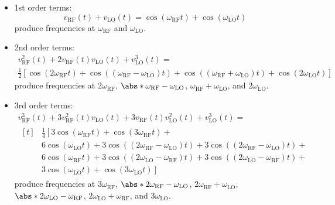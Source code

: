 \documentclass{article}
\begin{document}
\begin{itemize}
    \item 1st order terms:
          \begin{equation*}
              v_{\mathrm{RF}}\left( t \right) + v_{\mathrm{LO}}\left( t \right) = \cos{\left( \omega_{\mathrm{RF}} t \right)} + \cos{\left( \omega_{\mathrm{LO}} t \right)}
          \end{equation*}
          produce frequencies at \(\omega_{\mathrm{RF}}\) and \(\omega_{\mathrm{LO}}\).
    \item 2nd order terms:
          \begin{multline*}
              v_{\mathrm{RF}}^2\left( t \right) + 2 v_{\mathrm{RF}}\left( t \right) v_{\mathrm{LO}}\left( t \right) + v_{\mathrm{LO}}^3\left( t \right) = \\
              \frac{1}{2} \left[ \cos{\left( 2\omega_{\mathrm{RF}} t \right)} + \cos{\left( \left( \omega_{\mathrm{RF}} - \omega_{\mathrm{LO}} \right) t \right)} + \cos{\left( \left( \omega_{\mathrm{RF}} + \omega_{\mathrm{LO}} \right) t \right)} + \cos{\left( 2\omega_{\mathrm{LO}} t \right)} \right]
          \end{multline*}
          produce frequencies at \(2\omega_{\mathrm{RF}}\), \(\abs*{\omega_{\mathrm{RF}} - \omega_{\mathrm{LO}}}\), \(\omega_{\mathrm{RF}} + \omega_{\mathrm{LO}}\), and \(2\omega_{\mathrm{LO}}\).
    \item 3rd order terms:
          \begin{multline*}
              v_{\mathrm{RF}}^3\left( t \right) + 3 v_{\mathrm{RF}}^2\left( t \right) v_{\mathrm{LO}}\left( t \right) + 3 v_{\mathrm{RF}}\left( t \right) v_{\mathrm{LO}}^2\left( t \right) + v_{\mathrm{LO}}^3\left( t \right) = \\
              \begin{aligned}[t]
                   & \frac{1}{4} \left[ 3 \cos{\left( \omega_{\mathrm{RF}} t \right)} + \cos{\left( 3\omega_{\mathrm{RF}} t \right)} \right. +                                                                                                  \\
                   & 6\cos{\left( \omega_{\mathrm{LO}} t \right)} + 3\cos{\left( \left( 2\omega_{\mathrm{RF}} - \omega_{\mathrm{LO}} \right) t \right)} + 3\cos{\left( \left( 2\omega_{\mathrm{RF}} - \omega_{\mathrm{LO}} \right) t \right)} + {} \\
                   & 6\cos{\left( \omega_{\mathrm{RF}} t \right)} + 3\cos{\left( \left( 2\omega_{\mathrm{LO}} - \omega_{\mathrm{RF}} \right) t \right)} + 3\cos{\left( \left( 2\omega_{\mathrm{LO}} - \omega_{\mathrm{RF}} \right) t \right)} + {} \\
                   & \left. 3 \cos{\left( \omega_{\mathrm{LO}} t \right)} + \cos{\left( 3\omega_{\mathrm{LO}} t \right)} \right]
              \end{aligned}
          \end{multline*}
          produce frequencies at \(3\omega_{\mathrm{RF}}\), \(\abs*{2\omega_{\mathrm{RF}} - \omega_{\mathrm{LO}}}\), \(2\omega_{\mathrm{RF}} + \omega_{\mathrm{LO}}\), \(\abs*{2\omega_{\mathrm{LO}} - \omega_{\mathrm{RF}}}\), \(2\omega_{\mathrm{LO}} + \omega_{\mathrm{RF}}\), and \(3\omega_{\mathrm{LO}}\).
\end{itemize}
\end{document}
